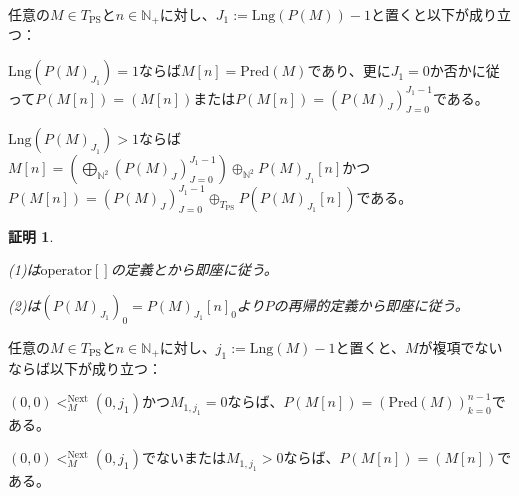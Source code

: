 \documentclass[dvipdfmx,uplatex]{jsarticle}
\theoremstyle{customnonumberbreakfortheorem}
\theoremstyle{customnonumberbreakforproof}
\newtheorem{hideableproof}{証明}
\begin{document}
\begin{proposition}[\(P\)と基本列の関係]\label{Pと基本列の関係}
	任意の\(M \in T_{\textrm{PS}}\)と\(n \in \mathbb{N}_{+}\)に対し、\(J_1 := \textrm{Lng}(P(M))-1\)と置くと以下が成り立つ：
	\begin{penumerate}
		\item \(\textrm{Lng}(P(M)_{J_1}) = 1\)ならば\(M[n] = \textrm{Pred}(M)\)であり、更に\(J_1 = 0\)か否かに従って\(P(M[n]) = (M[n])\)または\(P(M[n]) = (P(M)_J)_{J=0}^{J_1-1}\)である。
		\item \(\textrm{Lng}(P(M)_{J_1}) > 1\)ならば\(M[n] = (\bigoplus_{\mathbb{N}^2} (P(M)_J)_{J=0}^{J_1-1}) \oplus_{\mathbb{N}^2} P(M)_{J_1}[n]\)かつ\(P(M[n]) = (P(M)_J)_{J=0}^{J_1-1} \oplus_{T_{\textrm{PS}}} P(P(M)_{J_1}[n])\)である。
	\end{penumerate}
\end{proposition}

\begin{hideableproof}
	\begin{indented}
		\item (1)は\(\textrm{operator}[]\)の定義とから即座に従う。
		\item (2)は\((P(M)_{J_1})_0 = P(M)_{J_1}[n]_0\)より\(P\)の再帰的定義から即座に従う。
	\end{indented}
\end{hideableproof}

\begin{proposition}[非複項性と基本列の関係]\label{非複項性と基本列の関係}
	任意の\(M \in T_{\textrm{PS}}\)と\(n \in \mathbb{N}_{+}\)に対し、\(j_1 := \textrm{Lng}(M)-1\)と置くと、\(M\)が複項でないならば以下が成り立つ：
	\begin{penumerate}
		\item \((0,0) <_M^{\textrm{Next}} (0,j_1)\)かつ\(M_{1,j_1} = 0\)ならば、\(P(M[n]) = (\textrm{Pred}(M))_{k=0}^{n-1}\)である。
		\item \((0,0) <_M^{\textrm{Next}} (0,j_1)\)でないまたは\(M_{1,j_1} > 0\)ならば、\(P(M[n]) = (M[n])\)である。
	\end{penumerate}
\end{proposition}
\end{document}
